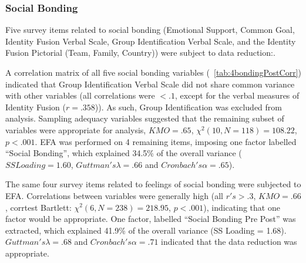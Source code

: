 \begin{CJK}{UTF8}{gbsn}



\subsubsection{Social Bonding}
Five survey items related to social bonding (Emotional Support, Common Goal, Identity Fusion Verbal Scale, Group Identification Verbal Scale, and the Identity Fusion Pictorial (Team, Family, Country)) were subject to data reduction:.

A correlation matrix of all five social bonding variables (~\ref{tab:4bondingPostCorr}) indicated that Group Identification Verbal Scale did not share common variance with other variables (all correlations were $<.1$, except for the verbal measures of Identity Fusion ($r =.358$)). As such, Group Identification was excluded from analysis.  Sampling adequacy variables suggested that the remaining subset of variables were appropriate for analysis, $KMO = .65$, $\chi^2(10, N = 118) = 108.22$, $p < .001$.  EFA was performed on 4 remaining items, imposing one factor labelled ``Social Bonding'', which explained 34.5\% of the overall variance ($SS Loading = 1.60$, $Guttman's \lambda =.66$ and $Cronbach's \alpha = .65$).

The same four survey items related to feelings of social bonding were subjected to EFA.  Correlations between variables were generally high (all $r's > .3$, $KMO = .66$, corrtest Bartlett: $\chi^2(6, N = 238) = 218.95$, $p < .001$), indicating that one factor would be appropriate.  One factor, labelled ``Social Bonding Pre Post'' was extracted, which explained 41.9\% of the overall variance (SS Loading = 1.68).  $Guttman's \lambda =.68$ and $Cronbach's \alpha = .71$ indicated that the data reduction was appropriate.


\end{CJK}
